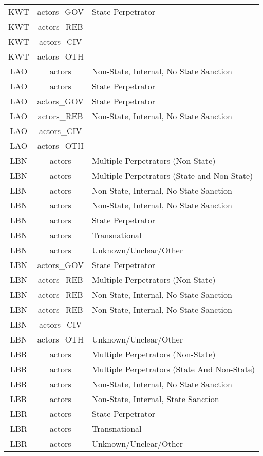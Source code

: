 \documentclass[12pt]{article}
\begin{document}
\begin{center}
\begin{longtable}{|c|c|p{10cm}|}
  KWT & actors\_GOV & State Perpetrator \\ 
  KWT & actors\_REB &  \\ 
  KWT & actors\_CIV &  \\ 
  KWT & actors\_OTH &  \\ 
  LAO & actors & Non-State, Internal, No State Sanction \\ 
  LAO & actors & State Perpetrator \\ 
  LAO & actors\_GOV & State Perpetrator \\ 
  LAO & actors\_REB & Non-State, Internal, No State Sanction \\ 
  LAO & actors\_CIV &  \\ 
  LAO & actors\_OTH &  \\ 
  LBN & actors & Multiple Perpetrators (Non-State) \\ 
  LBN & actors & Multiple Perpetrators (State and Non-State) \\ 
  LBN & actors & Non-State, Internal, No State Sanction \\ 
  LBN & actors & Non-State, Internal, No State Sanction \\ 
  LBN & actors & State Perpetrator \\ 
  LBN & actors & Transnational \\ 
  LBN & actors & Unknown/Unclear/Other \\ 
  LBN & actors\_GOV & State Perpetrator \\ 
  LBN & actors\_REB & Multiple Perpetrators (Non-State) \\ 
  LBN & actors\_REB & Non-State, Internal, No State Sanction \\ 
  LBN & actors\_REB & Non-State, Internal, No State Sanction \\ 
  LBN & actors\_CIV &  \\ 
  LBN & actors\_OTH & Unknown/Unclear/Other \\ 
  LBR & actors & Multiple Perpetrators (Non-State) \\ 
  LBR & actors & Multiple Perpetrators (State And Non-State) \\ 
  LBR & actors & Non-State, Internal, No State Sanction \\ 
  LBR & actors & Non-State, Internal, State Sanction \\ 
  LBR & actors & State Perpetrator \\ 
  LBR & actors & Transnational \\ 
  LBR & actors & Unknown/Unclear/Other \\ 

\end{longtable}
\end{center}
\end{document}
